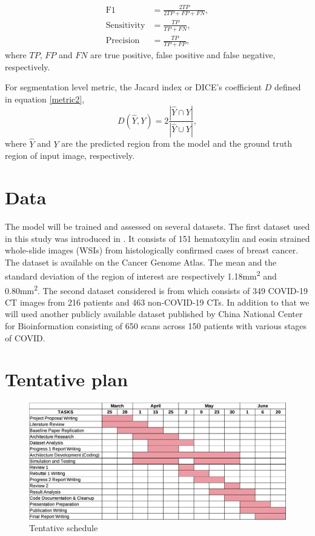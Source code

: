\documentclass[final]{cvpr}
\begin{document}
\begin{equation}
\begin{split}
   \text{F1} & = \frac{2TP}{2TP+FP+ FN}, \\
   \text{Sensitivity} & = \frac{TP}{TP+FN}, \\
   \text{Precision} & = \frac{TP}{TP+FP} ,
   \label{metric1}
\end{split}
\end{equation}
where $TP$, $FP$ and $FN$ are true positive, false positive and false negative, respectively.

For segmentation level metric, the Jacard index or DICE's coefficient $D$ defined in equation \ref{metric2},
\begin{equation}
    D(\hat{Y},Y)=2\frac{|\hat{Y} \cap Y|}{|\hat{Y} \cup Y|},
    \label{metric2}
\end{equation}
where $\hat{Y}$ and $Y$ are the predicted region from the model and the ground truth region of input image, respectively.

\section{Data}
The model will be trained and assessed on several datasets. The first dataset used in this study was introduced in \cite{10.1093/bioinformatics/btz083}. It consists of 151 hematoxylin and eosin strained whole-slide images (WSIs) from histologically confirmed cases of breast cancer. The dataset is available on the Cancer Genome Atlas. The mean and the standard deviation of the region of interest are respectively 1.18mm\textsuperscript{2} and 0.80mm\textsuperscript{2}. The second dataset considered is from \cite{zhao2020COVID-CT-Dataset} which consists of 349 COVID-19 CT images from 216 patients and 463 non-COVID-19 CTs. In addition to that we will used another publicly available dataset published by China National Center for Bioinformation \cite{Gunraj2020} consisting of 650 scans across 150 patients with various stages of COVID.

\newpage 
\section{Tentative plan}
\begin{figure}[h!]
\begin{center}
   \includegraphics[width=1.0\linewidth]{media/chart.png}
\end{center}
   \caption{Tentative schedule}
\label{fig:schedule}
\end{figure}
\end{document}
